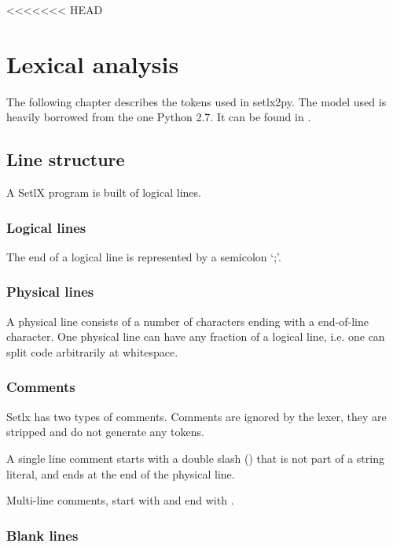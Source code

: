 <<<<<<< HEAD
\section{Lexical analysis}

The following chapter describes the tokens used in setlx2py. The model used is heavily borrowed from the one Python 2.7. It can be found in \cite{py2}.

%
%
\subsection{Line structure}

A SetlX program is built of logical lines.

%
\subsubsection{Logical lines}

The end of a logical line is represented by a semicolon `;'.

%
\subsubsection{Physical lines}

A physical line consists of a number of characters ending with a end-of-line character. One physical line can have any fraction of a logical line, i.e. one can split code arbitrarily at whitespace.

%
\subsubsection{Comments}

Setlx has two types of comments. Comments are ignored by the lexer, they are stripped and do not generate any tokens.


A single line comment starts with a double slash (\token{//}) that is not part of a string literal, and ends at the end of the physical line. 


Multi-line comments, start with \token{/*} and end with \token{*/}.

%
\subsubsection{Blank lines}

